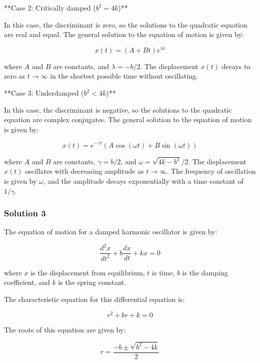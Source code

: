 \documentclass{article}
\begin{document}
**Case 2: Critically damped ($b^2 = 4k$)**

In this case, the discriminant is zero, so the solutions to the quadratic equation are real and equal. The general solution to the equation of motion is given by:

\begin{equation*}
x(t) = (A + Bt)e^{\lambda t}
\end{equation*}

where $A$ and $B$ are constants, and $\lambda = -b/2$. The displacement $x(t)$ decays to zero as $t \to \infty$ in the shortest possible time without oscillating.

**Case 3: Underdamped ($b^2 < 4k$)**

In this case, the discriminant is negative, so the solutions to the quadratic equation are complex conjugates. The general solution to the equation of motion is given by:

\begin{equation*}
x(t) = e^{-\gamma t}(A\cos(\omega t) + B\sin(\omega t))
\end{equation*}

where $A$ and $B$ are constants, $\gamma = b/2$, and $\omega = \sqrt{4k - b^2}/2$. The displacement $x(t)$ oscillates with decreasing amplitude as $t \to \infty$. The frequency of oscillation is given by $\omega$, and the amplitude decays exponentially with a time constant of $1/\gamma$.

\subsubsection{Solution 3}
The equation of motion for a damped harmonic oscillator is given by:

\begin{equation*}
\frac{d^2x}{dt^2} + b\frac{dx}{dt} + kx = 0
\end{equation*}

where $x$ is the displacement from equilibrium, $t$ is time, $b$ is the damping coefficient, and $k$ is the spring constant.

The characteristic equation for this differential equation is:

\begin{equation*}
r^2 + br + k = 0
\end{equation*}

The roots of this equation are given by:

\begin{equation*}
r = \frac{-b \pm \sqrt{b^2 - 4k}}{2}
\end{equation*}
\end{document}
